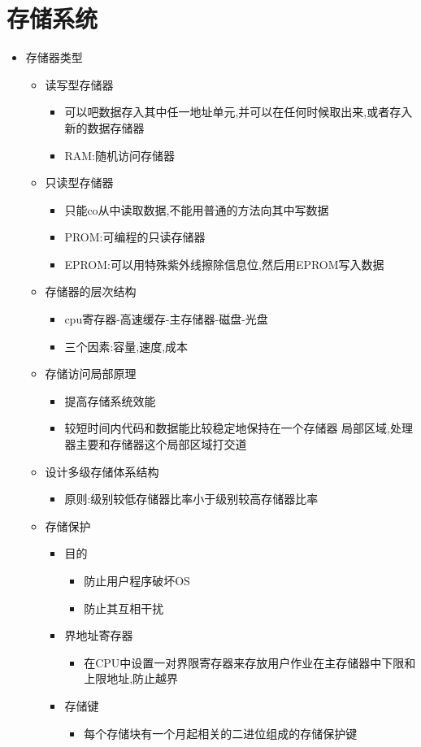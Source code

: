 \documentclass[a4paper,12pt,notitlepage]{article}
\begin{document}
\section{存储系统}
\begin{itemize}
	\item 存储器类型
	\begin{itemize}
		\item 读写型存储器
		\begin{itemize}
			\item 可以吧数据存入其中任一地址单元,并可以在任何时候取出来,或者存入新的数据存储器
			\item RAM:随机访问存储器
		\end{itemize}
		\item 只读型存储器
		\begin{itemize}
			\item 只能co从中读取数据,不能用普通的方法向其中写数据
			\item PROM:可编程的只读存储器
			\item EPROM:可以用特殊紫外线擦除信息位,然后用EPROM写入数据
		\end{itemize}
		\item 存储器的层次结构
		\begin{itemize}
			\item cpu寄存器-高速缓存-主存储器-磁盘-光盘
			\item 三个因素:容量,速度,成本
		\end{itemize}
		\item 存储访问局部原理
		\begin{itemize}
			\item 提高存储系统效能
			\item 较短时间内代码和数据能比较稳定地保持在一个存储器 局部区域,处理器主要和存储器这个局部区域打交道
		\end{itemize}
		\item 设计多级存储体系结构
		\begin{itemize}
			\item 原则:级别较低存储器比率小于级别较高存储器比率
		\end{itemize}
		\item 存储保护
		\begin{itemize}
			\item 目的
			\begin{itemize}
				\item 防止用户程序破坏OS
				\item 防止其互相干扰
			\end{itemize}
			\item 界地址寄存器
			\begin{itemize}
				\item 在CPU中设置一对界限寄存器来存放用户作业在主存储器中下限和上限地址,防止越界
			\end{itemize}
			\item 存储键
			\begin{itemize}
				\item 每个存储块有一个月起相关的二进位组成的存储保护键
			\end{itemize}
		\end{itemize}
	\end{itemize} 
\end{itemize}
\end{document}
